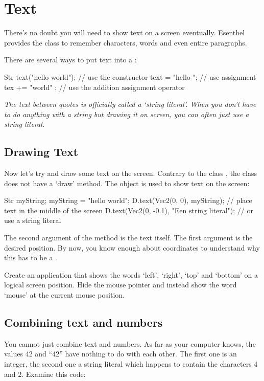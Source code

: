 \chapter{Text}

There's no doubt you will need to show text on a screen eventually. Esenthel provides the class  to remember characters, words and even entire paragraphs.

There are several ways to put text into a :

\begin{code}
Str text("hello world"); // use the constructor
text  = "hello "; // use assignment
tex += "world" ; // use the addition assignment operator
\end{code}

\textit{The text between quotes is officially called a `string literal'. When you don't have to do anything with a string but drawing it on screen, you can often just use a string literal.}

\section{Drawing Text}
Now let's try and draw some text on the screen. Contrary to the class , the  class does not have a `draw' method. The object  is used to show text on the screen:

\begin{code}
Str myString;
myString = "hello world";
D.text(Vec2(0, 0), myString); // place text in the middle of the screen
D.text(Vec2(0, -0.1), "Een string literal"); // or use a string literal
\end{code}

The second argument of the method  is the text itself. The first argument is the desired position. By now, you know enough about coordinates to understand why this has to be a .

\begin{exercise}
Create an application that shows the words `left', `right', `top' and `bottom' on a logical screen position. Hide the mouse pointer and instead show the word `mouse' at the current mouse position.
\end{exercise}

\section{Combining text and numbers}
You cannot just combine text and numbers. As far as your computer knows, the values 42 and ``42'' have nothing to do with each other. The first one is an integer, the second one a string literal which happens to contain the characters 4 and 2. Examine this code:

